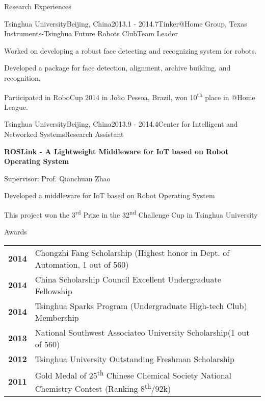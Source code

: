 \documentclass{resume} %
\begin{document}
\begin{rSection}{Research Experiences}
\newpage

\begin{rSubsection}{Tsinghua University}{Beijing, China}{2013.1 - 2014.7}{Tinker@Home Group, Texas Instruments-Tsinghua Future Robots Club}{Team Leader}

\item Worked on developing a robust face detecting and recognizing system for robots.
\item Developed a package for face detection, alignment, archive building, and recognition.
\item Participated in RoboCup 2014 in Jo$\tilde{a}$o Pessoa, Brazil, won 10\textsuperscript{th} place in @Home League.	
\end{rSubsection}

\begin{rSubsection}{Tsinghua University}{Beijing, China}{2013.9 - 2014.4}{Center for Intelligent and Networked Systems}{Research Assistant}
\item {\bf ROSLink - A Lightweight Middleware for IoT based on Robot Operating System}
\item Supervisor: Prof. Qianchuan Zhao
\item Developed a middleware for IoT based on Robot Operating System
\item This project won the 3\textsuperscript{rd} Prize in the 32\textsuperscript{nd} Challenge Cup in Tsinghua University

\end{rSubsection}




\end{rSection}



\begin{rSection}{Awards}

\begin{tabular}{ @{} >{\bfseries}l @{\hspace{3ex}} l }
2014 & Chongzhi Fang Scholarship (Highest honor in Dept. of Automation, 1 out of 560) \\
2014 & China Scholarship Council Excellent Undergraduate Fellowship \\
2014 &Tsinghua Sparks Program (Undergraduate High-tech Club) Membership\\

2013 & National Southwest Associateo University Scholarship(1 out of 560) \\
2012 & Tsinghua University Outstanding Freshman Scholarship \\
2011 & Gold Medal of 25\textsuperscript{th} Chinese Chemical Society National Chemistry Contest (Ranking 8\textsuperscript{th}/92k)
\end{tabular}

\end{rSection}
\end{document}
